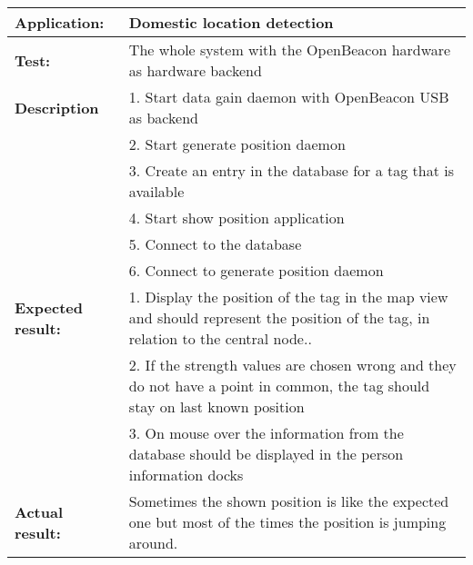    \begin{tabular}{|p{3.5cm}|p{10.5cm}|}
    \hline
     \textbf{Application:}	& Domestic location detection\\
    \hline
     \textbf{Test:}		& The whole system with the OpenBeacon hardware as hardware backend\\
    \hline
     \textbf{Description}	& 1. Start data gain daemon with OpenBeacon USB as backend\\
				& 2. Start generate position daemon\\
				& 3. Create an entry in the database for a tag that is available\\
				& 4. Start show position application\\
				& 5. Connect to the database\\
				& 6. Connect to generate position daemon \\
    \hline
     \textbf{Expected result:}	& 1. Display the position of the tag in the map view and should represent the position of the tag, in relation to the central node..\\
				& 2. If the strength values are chosen wrong and they do not have a point in common, the tag should stay on last known position \\
				& 3. On mouse over the information from the database should be displayed in the person information docks\\
    \hline
     \textbf{Actual result:}	& Sometimes the shown position is like the expected one but most of the times the position is jumping around.\\
    \hline
   \end{tabular}

